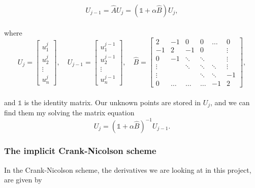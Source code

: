 \documentclass[12pt]{article}
\begin{document}
\begin{flushleft}
\vspace{5mm}
$$U_{j-1} = \hat{A}U_{j} = (\mathbb{1}+\alpha\hat{B})U_j,$$\\
where
\vspace{5mm}
\begin{equation}\label{eq:bkward_Euler_B}
U_j = 
\begin{bmatrix}
         u_1^j\\
         u_2^j\\
       \vdots\\
       u_n^j
     \end{bmatrix},\quad
U_{j-1} = 
\begin{bmatrix}
         u_1^{j-1}\\
         u_2^{j-1}\\
       \vdots\\
       u_n^{j-1}
     \end{bmatrix},\quad
\hat{B} = 
\begin{bmatrix}
       2 & -1 & 0 & 0 & \dots  & 0        \\
       -1 & 2 & -1 & 0  &  & \vdots \\
       0  & -1 & \ddots & \ddots & & \vdots \\
       \vdots &  & \ddots & \ddots & \ddots & \vdots \\
       \vdots & & & \ddots & \ddots & -1\\
       0 & \dots & \dots & \dots & -1 & 2
     \end{bmatrix},
\end{equation}\\
\vspace{5mm}
and $\mathbb{1}$ is the identity matrix. Our unknown points are stored in $U_j$, and we can find them my solving the matrix equation
\vspace{5mm}
\begin{equation}\label{eq:bkwrd_Euler_matrix}
U_j = (\mathbb{1}+\alpha\hat{B})^{-1}U_{j-1}.
\end{equation}
\vspace{5mm}
\subsubsection{The implicit Crank-Nicolson scheme\label{sect:numerical_crank-nicolson}}
In the Crank-Nicolson scheme, the derivatives we are looking at in this project, are given by


\end{flushleft}
\end{document}
